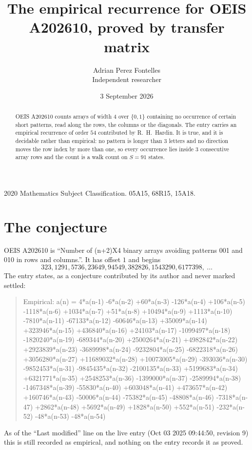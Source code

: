 \documentclass[11pt,a4paper]{article}
\title{The empirical recurrence for OEIS A202610, proved by transfer matrix}
\author{Adrian Perez Fontelles\\ \small Independent researcher}
\date{3 September 2026}
\theoremstyle{plain}
\theoremstyle{definition}
\begin{document}
\maketitle

\begin{abstract}
OEIS A202610 counts arrays of width $4$ over $\{0,1\}$ containing no occurrence of certain short
patterns, read along the rows, the columns or the diagonals. The entry carries an empirical
recurrence of order $54$ contributed by R.~H.~Hardin. It is true, and it is decidable
rather than empirical: no pattern is longer than $3$ letters and no direction moves the row
index by more than one, so every occurrence lies inside $3$ consecutive array rows and the
count is a walk count on $S=91$ states.
\end{abstract}

\noindent\small 2020 Mathematics Subject Classification. 05A15, 68R15, 15A18.\normalsize

\section{The conjecture}

OEIS A202610 is ``Number of (n+2)X4 binary arrays avoiding patterns 001 and 010 in rows and columns.''. It has offset $1$ and begins
\[
323, 1291, 5736, 23649, 94549, 382826, 1543290, 6177398,\ \dots
\]
The entry states, as a conjecture contributed by its author and never marked settled:
\begin{quote}
Empirical: a(n) = 4*a(n-1) -6*a(n-2) +60*a(n-3) -126*a(n-4) +106*a(n-5) -1118*a(n-6) +1034*a(n-7) +51*a(n-8) +10494*a(n-9) +1113*a(n-10) -7810*a(n-11) -67133*a(n-12) -60646*a(n-13) +35009*a(n-14) +323946*a(n-15) +436840*a(n-16) +24103*a(n-17) -1099497*a(n-18) -1820240*a(n-19) -689344*a(n-20) +2500264*a(n-21) +4982842*a(n-22) +2923839*a(n-23) -3689998*a(n-24) -9232804*a(n-25) -6822318*a(n-26) +3056280*a(n-27) +11689032*a(n-28) +10073005*a(n-29) -393036*a(n-30) -9852453*a(n-31) -9845435*a(n-32) -2100135*a(n-33) +5199683*a(n-34) +6321771*a(n-35) +2548253*a(n-36) -1399000*a(n-37) -2589994*a(n-38) -1467348*a(n-39) -55830*a(n-40) +603048*a(n-41) +473657*a(n-42) +160746*a(n-43) -50006*a(n-44) -75382*a(n-45) -48808*a(n-46) -7318*a(n-47) +2862*a(n-48) +5692*a(n-49) +1828*a(n-50) +552*a(n-51) -232*a(n-52) -48*a(n-53) -48*a(n-54)
\end{quote}
As of the ``Last modified'' line on the live entry (Oct 03 2025 09:44:50, revision 9) this is still
recorded as empirical, and nothing on the entry records it as proved.
\end{document}
